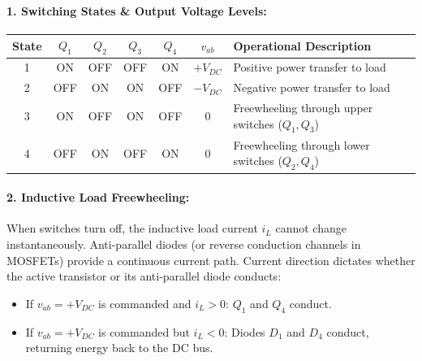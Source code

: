\paragraph{1. Switching States \& Output Voltage Levels:}
\begin{center}
\small
\begin{tabular}{@{}ccccccl@{}}
\toprule
\textbf{State} & $Q_1$ & $Q_2$ & $Q_3$ & $Q_4$ & $v_{ab}$ & \textbf{Operational Description} \\
\midrule
1 & ON & OFF & OFF & ON & $+V_{DC}$ & Positive power transfer to load \\
2 & OFF & ON & ON & OFF & $-V_{DC}$ & Negative power transfer to load \\
3 & ON & OFF & ON & OFF & $0$ & Freewheeling through upper switches ($Q_1, Q_3$) \\
4 & OFF & ON & OFF & ON & $0$ & Freewheeling through lower switches ($Q_2, Q_4$) \\
\bottomrule
\end{tabular}
\end{center}

\paragraph{2. Inductive Load Freewheeling:}
When switches turn off, the inductive load current $i_L$ cannot change instantaneously. Anti-parallel diodes (or reverse conduction channels in MOSFETs) provide a continuous current path. Current direction dictates whether the active transistor or its anti-parallel diode conducts:
\begin{itemize}
  \item If $v_{ab} = +V_{DC}$ is commanded and $i_L > 0$: $Q_1$ and $Q_4$ conduct.
  \item If $v_{ab} = +V_{DC}$ is commanded but $i_L < 0$: Diodes $D_1$ and $D_4$ conduct, returning energy back to the DC bus.
\end{itemize}

